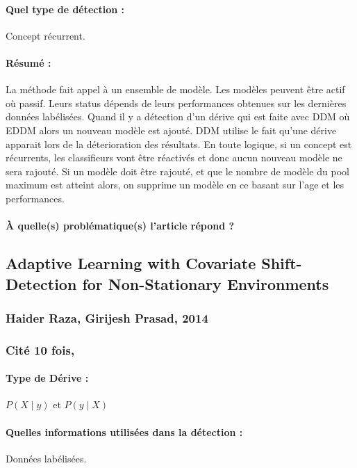 \documentclass[11pt,a4paper]{report}
\begin{document}
\paragraph{Quel type de détection :} Concept récurrent.

\paragraph{Résumé :} La méthode fait appel à un ensemble de modèle. Les modèles peuvent être actif où passif. Leurs status dépends de leurs performances obtenues sur les dernières données labélisées. Quand il y a détection d'un dérive qui est faite avec DDM où EDDM alors un nouveau modèle est ajouté. DDM utilise le fait qu'une dérive apparait lors de la déterioration des résultats. En toute logique, si un concept est récurrents, les classifieurs vont être réactivés et donc aucun nouveau modèle ne sera rajouté. Si un modèle doit être rajouté, et que le nombre de modèle du pool maximum est atteint alors, on supprime un modèle en ce basant sur l'age et les performances.

\paragraph{À quelle(s) problématique(s) l'article répond ?} 







\subsection{Adaptive Learning with Covariate Shift- Detection for Non-Stationary Environments}
\subsubsection{Haider Raza, Girijesh Prasad,  2014}

\subsubsection{Cité 10 fois, }

\paragraph{Type de Dérive :} $P(X\mid y)$ et $P(y \mid X)$ 
\paragraph{Quelles informations utilisées dans la détection :} Données labélisées.
\end{document}
